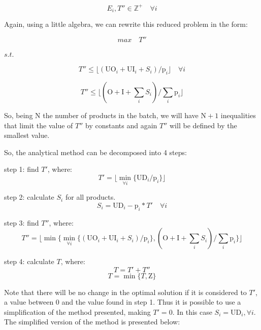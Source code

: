 \documentclass[authoryear,manuscript,12pt]{elsarticle}
\begin{document}
\begin{equation}
E_i, T'' \in  \mathbb{Z}^+ \quad \forall i
\end{equation}

Again, using a little algebra, we can rewrite this reduced problem in the form:

\begin{equation}
max \quad T''
\end{equation}

$s.t.$

\begin{equation}
T'' \leq \lfloor{(\textrm{UO}_i + \textrm{UI}_i + S_i) / \textrm{p}_i}\rfloor  \quad \forall i
\end{equation}

\begin{equation}
T'' \leq \lfloor{(\textrm{O} + \textrm{I} + \sum_i {S_i}) / \sum_i {\textrm{p}_i}}\rfloor
\end{equation}

So, being $\textrm{N}$ the number of products in the batch, we will have $\textrm{N}+1$ inequalities that limit the value of $T''$ by constants and again $T''$ will be defined by the smallest value.

So, the analytical method can be decomposed into 4 steps:

step 1: find $T'$, where:
\begin{equation}
T' = \lfloor{\min_{\forall i} \{\textrm{UD}_i / \textrm{p}_i\}}\rfloor
\end{equation}

step 2: calculate $S_i$ for all products.
\begin{equation}
\label{eq:unmet}
S_i = \textrm{UD}_i - \textrm{p}_i * T' \quad \forall i
\end{equation}

step 3: find $T''$, where:
\begin{equation}
T'' = \lfloor{\min \{\min_{\forall i} \{(\textrm{UO}_i + \textrm{UI}_i + S_i) / \textrm{p}_i\},(\textrm{O} + \textrm{I} + \sum_i {S_i}) / \sum_i {\textrm{p}_i}\}}\rfloor
\end{equation}

step 4: calculate $T$, where: 
\begin{equation}
T = T' + T''
\end{equation}
\begin{equation}
T = \min \{T , \textrm{Z}\}
\end{equation}

Note that there will be no change in the optimal solution if it is considered to $T'$, a value between 0 and the value found in step 1. Thus it is possible to use a simplification of the method presented, making $T' = 0$. In this case $S_i = \textrm{UD}_i, \forall i$. The simplified version of the method is presented below:
\end{document}
